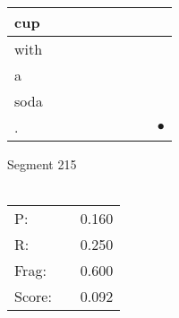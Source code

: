 \documentclass[landscape]{article}
\newcommand{\ssp}{\hspace{2pt}}
\newcommand{\mex}{\cellcolor{g}$\bullet$}
\begin{document}
\begin{tabular}{|l|p{10pt}|p{10pt}|p{10pt}|p{10pt}|p{10pt}|p{10pt}|p{10pt}|p{10pt}|}
\hline
\ssp cup \ssp&\hspace{2pt}&\hspace{2pt}&\hspace{2pt}&\hspace{2pt}&\hspace{2pt}&\hspace{2pt}&\hspace{2pt}&\hspace{2pt}\\
\hline
\ssp with \ssp&\hspace{2pt}&\hspace{2pt}&\hspace{2pt}&\hspace{2pt}&\hspace{2pt}&\hspace{2pt}&\hspace{2pt}&\hspace{2pt}\\
\hline
\ssp a \ssp&\hspace{2pt}&\hspace{2pt}&\hspace{2pt}&\hspace{2pt}&\hspace{2pt}&\hspace{2pt}&\hspace{2pt}&\hspace{2pt}\\
\hline
\ssp soda \ssp&\hspace{2pt}&\hspace{2pt}&\hspace{2pt}&\hspace{2pt}&\hspace{2pt}&\hspace{2pt}&\hspace{2pt}&\hspace{2pt}\\
\hline
\ssp \cellcolor{ref7}. \ssp&\hspace{2pt}&\hspace{2pt}&\hspace{2pt}&\hspace{2pt}&\hspace{2pt}&\hspace{2pt}&\hspace{2pt}&\hspace{2pt}\mex\\
\hline
\end{tabular}

\vspace{6pt}
\noindent Segment 215\\\\
\noindent\begin{tabular}{lm{12pt}r}
\hline
P:&&0.160\\
R:&&0.250\\
Frag:&&0.600\\
Score:&&0.092\\
\end{tabular}
\end{document}
